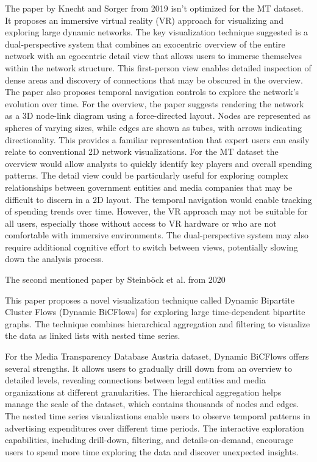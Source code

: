 \documentclass{vgtc}
\begin{document}
The paper by Knecht and Sorger from 2019 \cite{sorger2019immersive} isn't optimized for the MT dataset. It proposes an immersive virtual reality (VR) approach for visualizing and exploring large dynamic networks. The key visualization technique suggested is a dual-perspective system that combines an exocentric overview of the entire network with an egocentric detail view that allows users to immerse themselves within the network structure. This first-person view enables detailed inspection of dense areas and discovery of connections that may be obscured in the overview. The paper also proposes temporal navigation controls to explore the network's evolution over time. For the overview, the paper suggests rendering the network as a 3D node-link diagram using a force-directed layout. Nodes are represented as spheres of varying sizes, while edges are shown as tubes, with arrows indicating directionality. This provides a familiar representation that expert users can easily relate to conventional 2D network visualizations.
For the MT dataset the overview would allow analysts to quickly identify key players and overall spending patterns. The detail view could be particularly useful for exploring complex relationships between government entities and media companies that may be difficult to discern in a 2D layout. The temporal navigation would enable tracking of spending trends over time. However, the VR approach may not be suitable for all users, especially those without access to VR hardware or who are not comfortable with immersive environments. The dual-perspective system may also require additional cognitive effort to switch between views, potentially slowing down the analysis process.

\medskip

The second mentioned paper by Steinböck et al. from 2020 \cite{Waldner2020InteractiveEO} 


This paper proposes a novel visualization technique called Dynamic Bipartite Cluster Flows (Dynamic BiCFlows) for exploring large time-dependent bipartite graphs. The technique combines hierarchical aggregation and filtering to visualize the data as linked lists with nested time series. 

For the Media Transparency Database Austria dataset, Dynamic BiCFlows offers several strengths. It allows users to gradually drill down from an overview to detailed levels, revealing connections between legal entities and media organizations at different granularities. The hierarchical aggregation helps manage the scale of the dataset, which contains thousands of nodes and edges. The nested time series visualizations enable users to observe temporal patterns in advertising expenditures over different time periods. The interactive exploration capabilities, including drill-down, filtering, and details-on-demand, encourage users to spend more time exploring the data and discover unexpected insights.
\end{document}
